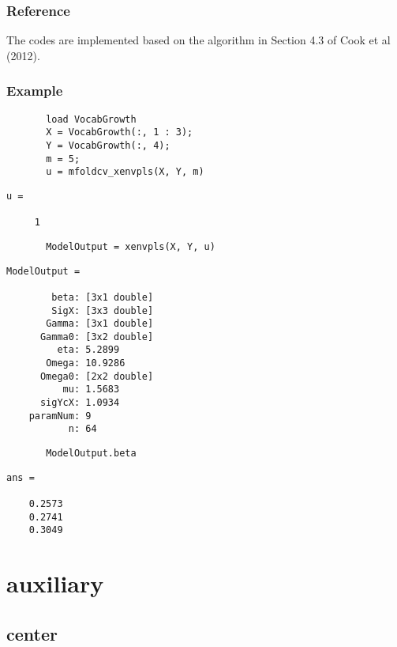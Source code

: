 \documentclass[a4paper,11pt,openany]{memoir}
\begin{document}
\subsection*{Reference}

\begin{par}
The codes are implemented based on the algorithm in Section 4.3 of Cook et al (2012).
\end{par} \vspace{1em}


\subsection*{Example}


\begin{verbatim}       load VocabGrowth
       X = VocabGrowth(:, 1 : 3);
       Y = VocabGrowth(:, 4);
       m = 5;
       u = mfoldcv_xenvpls(X, Y, m)\end{verbatim}
        \color{lightgray} \ttfamily\begin{verbatim}
u =

     1
\end{verbatim}\rmfamily
 \color{black}
\begin{verbatim}       ModelOutput = xenvpls(X, Y, u)\end{verbatim}
        \color{lightgray}\ttfamily \begin{verbatim}
ModelOutput = 

        beta: [3x1 double]
        SigX: [3x3 double]
       Gamma: [3x1 double]
      Gamma0: [3x2 double]
         eta: 5.2899
       Omega: 10.9286
      Omega0: [2x2 double]
          mu: 1.5683
      sigYcX: 1.0934
    paramNum: 9
           n: 64
\end{verbatim}\rmfamily
 \color{black}

\begin{verbatim}       ModelOutput.beta\end{verbatim}    
        \color{lightgray}\ttfamily \begin{verbatim}
ans =

    0.2573
    0.2741
    0.3049

\end{verbatim}\rmfamily \color{black}
\newpage

\chapter{auxiliary}

    
\rmfamily
\color{black}\section{center}
\end{document}
